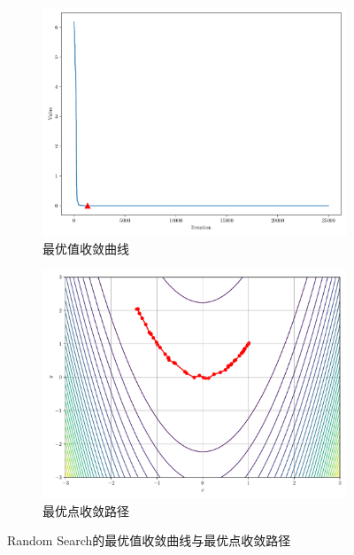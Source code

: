 \begin{figure}[!ht]
    \centering
    \begin{subfigure}{0.4\textwidth}
        \centering
        \includegraphics[width=\textwidth]{figures/Random Search_loss.pdf}
        \caption{最优值收敛曲线}
    \end{subfigure}
    \begin{subfigure}{0.4\textwidth}
        \centering
        \includegraphics[width=\textwidth]{figures/Random Search_points.pdf}
        \caption{最优点收敛路径}
    \end{subfigure}
    \caption{Random Search的最优值收敛曲线与最优点收敛路径}
    \label{figure:random search}
\end{figure}
